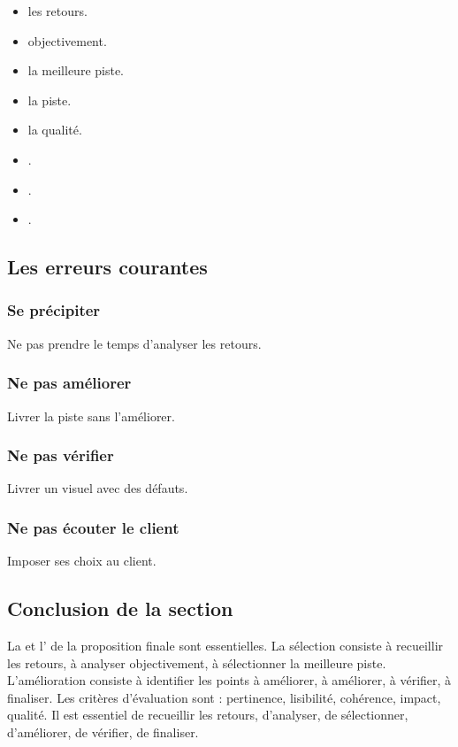 \begin{itemize}
    \item {} les retours.
    \item {} objectivement.
    \item {} la meilleure piste.
    \item {} la piste.
    \item {} la qualité.
    \item {}.
    \item {}.
    \item {}.
\end{itemize}

\subsection{Les erreurs courantes}

\subsubsection{Se précipiter}

Ne pas prendre le temps d'analyser les retours.

\subsubsection{Ne pas améliorer}

Livrer la piste sans l'améliorer.

\subsubsection{Ne pas vérifier}

Livrer un visuel avec des défauts.

\subsubsection{Ne pas écouter le client}

Imposer ses choix au client.

\subsection*{Conclusion de la section}

La  et l' de la proposition finale sont essentielles. La sélection consiste à recueillir les retours, à analyser objectivement, à sélectionner la meilleure piste. L'amélioration consiste à identifier les points à améliorer, à améliorer, à vérifier, à finaliser. Les critères d'évaluation sont : pertinence, lisibilité, cohérence, impact, qualité. Il est essentiel de recueillir les retours, d'analyser, de sélectionner, d'améliorer, de vérifier, de finaliser.

